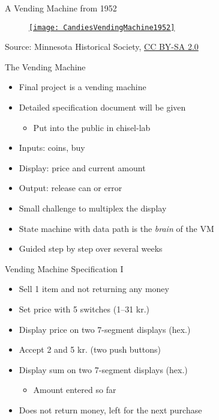 \begin{frame}[fragile]{A Vending Machine from 1952}
\begin{figure}
    \centering
    \href{https://en.wikipedia.org/wiki/File:CandiesVendingMachine1952.jpg}{\texttt{[image: CandiesVendingMachine1952]}}

\end{figure}

{\tiny Source: Minnesota Historical Society, \href{https://creativecommons.org/licenses/by-sa/2.0}{CC BY-SA 2.0}}
\end{frame}

\begin{frame}[fragile]{The Vending Machine}
\begin{itemize}
\item Final project is a vending machine
\item Detailed specification document will be given
\begin{itemize}
\item Put into the public in chisel-lab
\end{itemize}
\item Inputs: coins, buy
\item Display: price and current amount
\item Output: release can or error
\item Small challenge to multiplex the display
\item State machine with data path is the \emph{brain} of the VM
\item Guided step by step over several weeks
\end{itemize}
\end{frame}

\begin{frame}[fragile]{Vending Machine Specification I}
\begin{itemize}
\item Sell 1 item and not returning any money
\item Set price with 5 switches (1--31 kr.)
\item Display price on two 7-segment displays (hex.)
\item Accept 2 and 5 kr. (two push buttons)
\item Display sum on two 7-segment displays (hex.)
\begin{itemize}
\item Amount entered so far
\end{itemize}
\item Does not return money, left for the next purchase
\end{itemize}
\end{frame}


